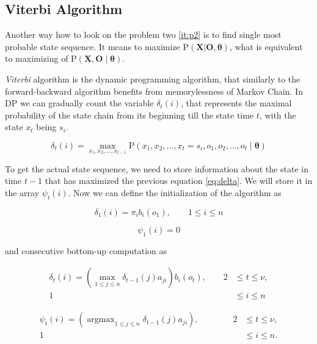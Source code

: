 \documentclass[thesis=M,english]{FITthesis}[2012/10/20]
\newcommand{\matr}[1]{\mathbf{#1}}
\newcommand{\argmax}{\mathop{\mathrm{argmax}}}
\begin{document}
\subsection{Viterbi Algorithm} 

Another way how to look on the problem two \ref{it:p2} is to find single most probable state sequence. It means to maximize $\mathrm{P}(\matr{X} | \matr{O},\matr{\theta})$, what is equivalent to maximizing of $\mathrm{P}(\matr{X},\matr{O} \mid \matr{\theta})$.

\textit{Viterbi} algorithm is the dynamic programming algorithm, that similarly to the forward-backward algorithm  benefits from memorylessness of Markov Chain. In DP we can gradually count the variable $\delta_t(i)$, that represents the maximal probability of the state chain from its beginning till the state time $t$, with the state $x_{t}$  being $s_i$.

\begin{equation}\label{eq:delta}
\delta_t(i) = \max_{x_1,x_2,\dots,x_{t-1}} \mathrm{P}( x_1,x_2,\dots, x_t = s_i, o_1, o_2, \dots, o_t \mid \matr{\theta} )
\end{equation} 

To get the actual state sequence, we need to store information about the state in time $t-1$ that has maximized the previous equation \eqref{eq:delta}. We will store it in the array $\psi_t(i)$. Now we can define the initialization of the algorithm as

\begin{equation}
\delta_1(i) = \pi_i b_i(o_1), \qquad 1 \leq i \leq n 
\end{equation}

\begin{equation}
\psi_1(i) = 0 
\end{equation}

and consecutive bottom-up computation as

\begin{equation}
\begin{aligned}
\delta_{t}(i) = ( \max_{ 1 \leq j \leq n } \delta_{t-1}(j)a_{ji} ) b_i(o_{t}), \qquad 2& \leq t \leq \nu, \\
																					   1& \leq i \leq n
\end{aligned}
\end{equation}

\begin{equation}
\begin{aligned}
\psi_{t}(i) = ( \argmax_{ 1 \leq j \leq n } \delta_{t-1}(j)a_{ji} ), \qquad \qquad 2& \leq t \leq \nu, \\
																			       1& \leq i \leq n.
\end{aligned}
\end{equation}
\end{document}
